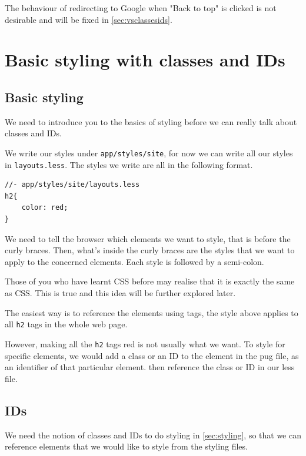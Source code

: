 The behaviour of redirecting to Google when "Back to top" is clicked is not desirable and will be fixed in \cref{sec:vsclassesids}.

\section{Basic styling with classes and IDs}
\label{sec:classesids}

\subsection{Basic styling}

We need to introduce you to the basics of styling before we can really talk about classes and IDs.

We write our styles under \texttt{app/styles/site}, for now we can write all our styles in \texttt{layouts.less}. The styles we write are all in the following format. 

\begin{lstlisting}[language=pug]
//- app/styles/site/layouts.less
h2{
    color: red;
}
\end{lstlisting}

We need to tell the browser which elements we want to style, that is before the curly braces. Then, what's inside the curly braces are the styles that we want to apply to the concerned elements. Each style is followed by a semi-colon.
\vspace{6mm}

Those of you who have learnt CSS before may realise that it is exactly the same as CSS. This is true and this idea will be further explored later.
\vspace{6mm}

The easiest way is to reference the elements using tags, the style above applies to all \texttt{h2} tags in the whole web page. 

However, making all the \texttt{h2} tags red is not usually what we want. To style for specific elements, we would add a class or an ID to the element in the pug file, as an identifier of that particular element. then reference the class or ID in our less file.

\subsection{IDs}

We need the notion of classes and IDs to do styling in \cref{sec:styling}, so that we can reference elements that we would like to style from the styling files.

